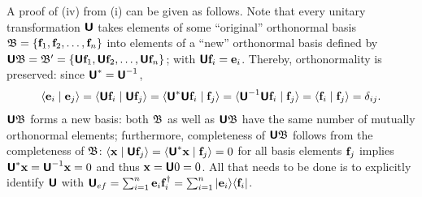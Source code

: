 {A proof of (iv) from (i) can be given as follows.
Note that every unitary transformation $\textsf{\textbf{U}}$
takes elements of  some ``original'' orthonormal basis
${\frak B}=\{{\bf f}_1,  {\bf f}_2, \ldots , {\bf f}_n\}$
into elements of a ``new'' orthonormal basis defined by
$\textsf{\textbf{U}}{\frak B}={\frak B}'=\{\textsf{\textbf{U}}{\bf f}_1, \textsf{\textbf{U}} {\bf f}_2,
\ldots ,\textsf{\textbf{U}} {\bf f}_n\}$; with  $\textsf{\textbf{U}} {\bf f}_i   = {\bf e}_i$.
Thereby, orthonormality is preserved:
since $\textsf{\textbf{U}}^\ast =\textsf{\textbf{U}}^{-1}$,
\begin{equation}
\begin{split}
\langle  {\bf e}_i \mid   {\bf e}_j  \rangle
= \langle \textsf{\textbf{U}} {\bf f}_i \mid \textsf{\textbf{U}}  {\bf f}_j  \rangle
=
\langle \textsf{\textbf{U}}^\ast \textsf{\textbf{U}} {\bf f}_i \mid  {\bf f}_j  \rangle
=
\langle \textsf{\textbf{U}}^{-1}\textsf{\textbf{U}} {\bf f}_i \mid  {\bf f}_j  \rangle
=
\langle  {\bf f}_i \mid  {\bf f}_j  \rangle = \delta_{ij}.
\end{split}
\label{2016-m-ch-uniteq71}
\end{equation}
$ \textsf{\textbf{U}} {\frak B} $
forms a new basis: both $  {\frak B} $ as well as $ \textsf{\textbf{U}} {\frak B} $
have the same number of mutually orthonormal elements; furthermore, completeness of $ \textsf{\textbf{U}} {\frak B} $
follows from the completeness of $ {\frak B} $:
$
\langle  {\bf x} \mid \textsf{\textbf{U}} {\bf f}_j  \rangle
=
\langle  \textsf{\textbf{U}}^\ast  {\bf x} \mid {\bf f}_j  \rangle
=0
$ for all basis elements ${\bf f}_j$ implies $ \textsf{\textbf{U}}^\ast  {\bf x} =
\textsf{\textbf{U}}^{-1}  {\bf x} =0$ and thus    ${\bf x} = \textsf{\textbf{U}}0=0$.
All that needs to be done is to explicitly identify $\textsf{\textbf{U}}$ with
$\textsf{\textbf{U}}_{ef}   = \sum_{i=1}^n{\bf e}_i  {\bf f}_i^\dagger
 = \sum_{i=1}^n \vert {\bf e}_i \rangle \langle {\bf f}_i \vert$.

}
